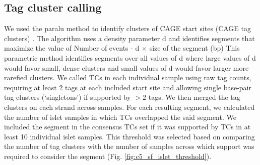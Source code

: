 \subsection{Tag cluster calling} 
We used the paralu method to identify clusters of CAGE start sites (CAGE tag clusters) \cite{frithCodeTranscriptionInitiation2008}. The algorithm uses a density parameter d and identifies segments that maximize the value of 
Number of events - d $\times$ size of the segment (bp)
This parametric method identifies segments over all values of d where large values of d would favor small, dense clusters and small values of d would favor larger more rarefied clusters. 
We called TCs in each individual sample using raw tag counts, requiring at least 2 tags at each included start site and allowing single base-pair tag clusters (‘singletons’) if supported by $>$2 tags. We then merged the tag clusters on each strand across samples. For each resulting segment, we calculated the number of islet samples in which TCs overlapped the said segment. We included the segment in the consensus TCs set if it was supported by TCs in at least 10 individual islet samples. This threshold was selected based on comparing the number of tag clusters with the number of samples across which support was required to consider the segment (Fig. \ref{fig:c5_sf_islet_threshold}). 
  
